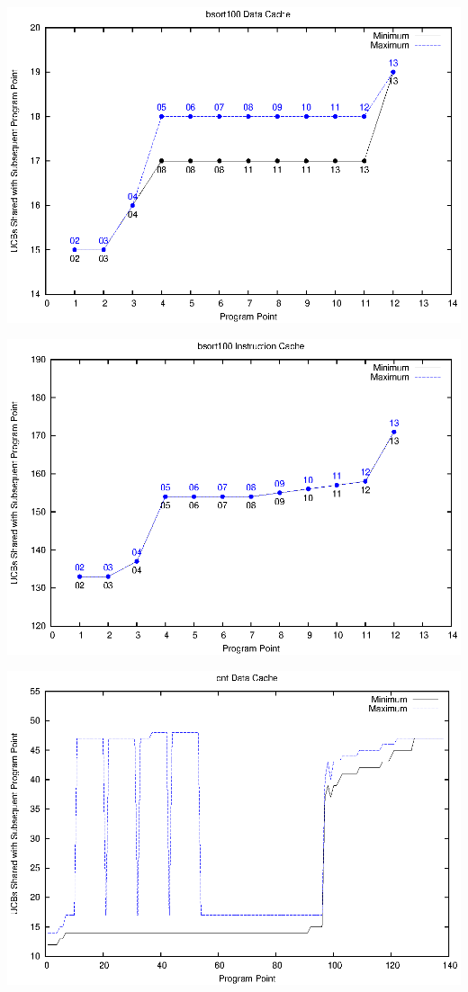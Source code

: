 \begin{center}
  \includegraphics[width=\linewidth]{eps/bsort100-dcache.eps}
\end{center}
\begin{center}
  \includegraphics[width=\linewidth]{eps/bsort100-icache.eps}
\end{center}
\begin{center}
  \includegraphics[width=\linewidth]{eps/cnt-dcache.eps}
\end{center}
